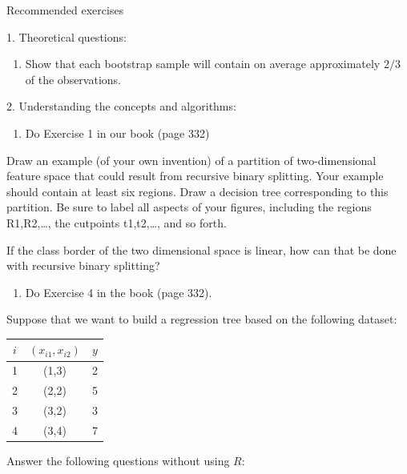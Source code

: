 \documentclass[ignorenonframetext,]{beamer}
\providecommand{\tightlist}{%
  \setlength{\itemsep}{0pt}\setlength{\parskip}{0pt}}
\begin{document}
\begin{frame}[fragile]{Recommended exercises}

\begin{block}{1. Theoretical questions:}

\begin{enumerate}
\def\labelenumi{\alph{enumi})}
\tightlist
\item
  Show that each bootstrap sample will contain on average approximately
  \(2/3\) of the observations.
\end{enumerate}

\end{block}

\begin{block}{2. Understanding the concepts and algorithms:}

\begin{enumerate}
\def\labelenumi{\alph{enumi})}
\tightlist
\item
  Do Exercise 1 in our book (page 332)
\end{enumerate}

Draw an example (of your own invention) of a partition of
two-dimensional feature space that could result from recursive binary
splitting. Your example should contain at least six regions. Draw a
decision tree corresponding to this partition. Be sure to label all
aspects of your figures, including the regions R1,R2,\ldots{}, the
cutpoints t1,t2,\ldots{}, and so forth.

If the class border of the two dimensional space is linear, how can that
be done with recursive binary splitting?

\begin{enumerate}
\def\labelenumi{\alph{enumi})}
\setcounter{enumi}{1}
\tightlist
\item
  Do Exercise 4 in the book (page 332).
\end{enumerate}

Suppose that we want to build a regression tree based on the following
dataset:

\begin{longtable}[]{@{}ccc@{}}
\toprule
\(i\) & \((x_{i1},x_{i2})\) & \(y\)\tabularnewline
\midrule
\endhead
1 & (1,3) & 2\tabularnewline
2 & (2,2) & 5\tabularnewline
3 & (3,2) & 3\tabularnewline
4 & (3,4) & 7\tabularnewline
\bottomrule
\end{longtable}

Answer the following questions without using \(R\):


\end{block}
\end{frame}
\end{document}
